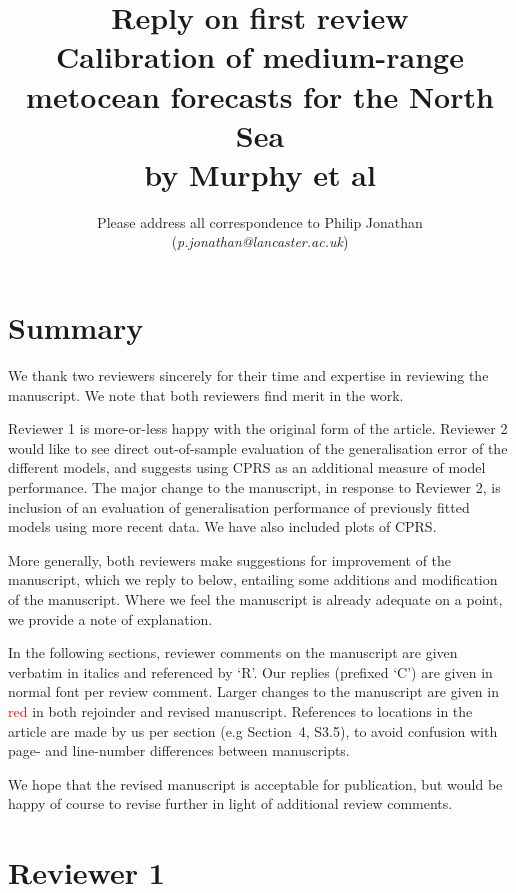 \documentclass[a4paper,10pt]{article}
\providecommand{\np}{\vspace{10pt}}
\newcommand{\ed}[1]{\textcolor{red}{#1}}
\providecommand{\np}{\vspace{10pt}}
\begin{document}
	
	\title{\textbf{Reply on first review} \np \\ {Calibration of medium-range metocean forecasts for the North Sea} \np \\ by Murphy et al}
	\np
	\author{Please address all correspondence to Philip Jonathan (\emph{p.jonathan@lancaster.ac.uk})}
	\date{}
	\maketitle
	
	\section*{Summary}
	
	We thank two reviewers sincerely for their time and expertise in reviewing the manuscript. We note that both reviewers find merit in the work. 
	
	Reviewer 1 is more-or-less happy with the original form of the article. Reviewer 2 would like to see direct out-of-sample evaluation of the generalisation error of the different models, and suggests using CPRS as an additional measure of model performance. The major change to the manuscript, in response to Reviewer 2, is inclusion of an evaluation of generalisation performance of previously fitted models using more recent data. We have also included plots of CPRS.
	
	More generally, both reviewers make suggestions for improvement of the manuscript, which we reply to below, entailing some additions and modification of the manuscript. Where we feel the manuscript is already adequate on a point, we provide a note of explanation. 
	
	In the following sections, reviewer comments on the manuscript are given verbatim in italics and referenced by `R'. Our replies (prefixed `C') are given in normal font per review comment. Larger changes to the manuscript are given in \ed{red} in both rejoinder and revised manuscript. References to locations in the article are made by us per section (e.g Section~4, S3.5), to avoid confusion with page- and line-number differences between manuscripts. 
	
	We hope that the revised manuscript is acceptable for publication, but would be happy of course to revise further in light of additional review comments.
		
	\section*{Reviewer 1}
	
\end{document}
